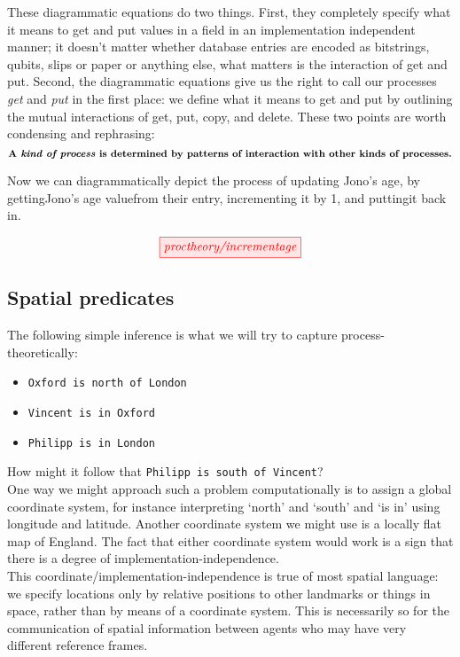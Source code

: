 These diagrammatic equations do two things. First, they completely specify what it means to get and put values in a field in an implementation independent manner; it doesn't matter whether database entries are encoded as bitstrings, qubits, slips or paper or anything else, what matters is the interaction of get and put. Second, the diagrammatic equations give us the right to call our processes \emph{get} and \emph{put} in the first place: we define what it means to get and put by outlining the mutual interactions of get, put, copy, and delete. These two points are worth condensing and rephrasing:
\[
\textbf{A \emph{kind of process} is determined by patterns of interaction with other kinds of processes.}
\]

Now we can diagrammatically depict the process of updating Jono's age, by \bB getting\e Jono's \bO age value\e from their \bM entry\e, incrementing it by 1, and \bB putting\e it back in.

\[\tikzfig{proctheory/incrementage}\]

\subsection{Spatial predicates}

The following simple inference is what we will try to capture process-theoretically:

\begin{itemize}
\item \texttt{Oxford is north of London}
\item \texttt{Vincent is in Oxford}
\item \texttt{Philipp is in London}
\end{itemize}

How might it follow that \texttt{Philipp is south of Vincent}?\\

One way we might approach such a problem computationally is to assign a global coordinate system, for instance interpreting `north' and `south' and `is in' using longitude and latitude. Another coordinate system we might use is a locally flat map of England. The fact that either coordinate system would work is a sign that there is a degree of implementation-independence.\\

This coordinate/implementation-independence is true of most spatial language: we specify locations only by relative positions to other landmarks or things in space, rather than by means of a coordinate system. This is necessarily so for the communication of spatial information between agents who may have very different reference frames.\\


